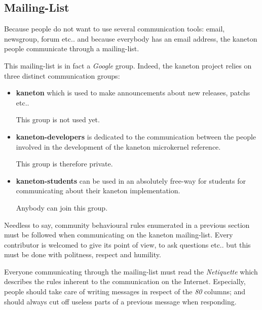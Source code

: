 %
%
%
%
%
%

%
%

\subsection{Mailing-List}
\label{section:mailing-list}

Because people do not want to use several communication tools: email,
newsgroup, forum etc.. and because everybody has an email address, the
kaneton people communicate through a mailing-list.

This mailing-list is in fact a \textit{Google} group. Indeed, the kaneton
project relies on three distinct communication groups:

\begin{itemize}
  \item
    \textbf{kaneton} which is used to make announcements about new releases,
    patchs etc..

    \-

    This group is not used yet.
  \item
    \textbf{kaneton-developers} is dedicated to the communication between the
    people involved in the development of the kaneton microkernel reference.

    \-

    This group is therefore private.
  \item
    \textbf{kaneton-students} can be used in an absolutely free-way for
    students for communicating about their kaneton implementation.

    \-

    Anybody can join this group.
\end{itemize}

Needless to say, community behavioural rules enumerated in a previous section
must be followed when communicating on the kaneton mailing-list. Every
contributor is welcomed to give its point of view, to ask questions etc.. but
this must be done with politness, respect and humility.

Everyone communicating through the mailing-list must read the
\textit{Netiquette} which describes the rules inherent to the communication
on the Internet. Especially, people should take care of writing messages in
respect of the \textit{80} columns; and should always cut off useless parts
of a previous message when responding.

